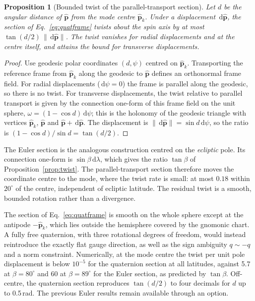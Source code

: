 \documentclass[11pt,a4paper]{article}
\newtheorem{proposition}{Proposition}
\theoremstyle{remark}
\newcommand{\uv}[1]{\hat{\bm{#1}}}
\newcommand{\dd}{\,\mathrm{d}}
\begin{document}
\begin{proposition}[Bounded twist of the parallel-transport section]
\label{prop:qtwist}
Let $d$ be the angular distance of $\uv p$ from the mode centre $\uv p_k$. Under a displacement
$\dd\uv p$, the section of Eq.~\eqref{eq:quatframe} twists about the spin axis by at most
$\tan(d/2)\,\lVert\dd\uv p\rVert$. The twist vanishes for radial displacements and at the centre
itself, and attains the bound for transverse displacements.
\end{proposition}
\begin{proof}
Use geodesic polar coordinates $(d,\psi)$ centred on $\uv p_k$. Transporting the reference frame from
$\uv p_k$ along the geodesic to $\uv p$ defines an orthonormal frame field. For radial displacements
($\dd\psi=0$) the frame is parallel along the geodesic, so there is no twist. For transverse
displacements, the twist relative to parallel transport is given by the connection one-form of this
frame field on the unit sphere, $\omega=(1-\cos d)\dd\psi$; this is the holonomy of the geodesic
triangle with vertices $\uv p_k$, $\uv p$ and $\uv p+\dd\uv p$. The displacement is
$\lVert\dd\uv p\rVert=\sin d\dd\psi$, so the ratio is $(1-\cos d)/\sin d=\tan(d/2)$.
\end{proof}

The Euler section is the analogous construction centred on the \emph{ecliptic} pole. Its connection
one-form is $\sin\beta\dd\lambda$, which gives the ratio $\tan\beta$ of
Proposition~\ref{prop:twist}. The parallel-transport section therefore moves the coordinate centre to
the mode, where the twist rate is small: at most $0.18$ within $20^\circ$ of the centre, independent of
ecliptic latitude. The residual twist is a smooth, bounded rotation rather than a divergence.

The section of Eq.~\eqref{eq:quatframe} is smooth on the whole sphere except at the antipode
$-\uv p_k$, which lies outside the hemisphere covered by the gnomonic chart. A fully free quaternion,
with three rotational degrees of freedom, would instead reintroduce the exactly flat gauge direction, as
well as the sign ambiguity $q\sim-q$ and a norm constraint. Numerically, at the mode centre the twist per unit pole displacement is below $10^{-5}$ for the
quaternion section at all latitudes, against 5.7 at $\beta=80^\circ$ and 60 at $\beta=89^\circ$ for
the Euler section, as predicted by $\tan\beta$. Off-centre, the quaternion section reproduces
$\tan(d/2)$ to four decimals for $d$ up to 0.5\,rad. The previous Euler
results remain available through an option.
\end{document}
